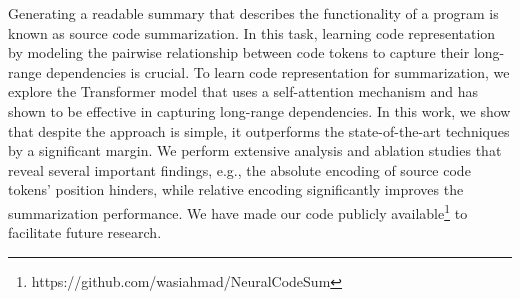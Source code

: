 Generating a readable summary that describes the functionality of a program is known as source code summarization. In this task, learning code representation by modeling the pairwise relationship between code tokens to capture their long-range dependencies is crucial. To learn code representation for summarization, we explore the Transformer model that uses a self-attention mechanism and has shown to be effective in capturing long-range dependencies. In this work, we show that despite the approach is simple, it outperforms the state-of-the-art techniques by a significant margin. We perform extensive analysis and ablation studies that reveal several important findings, e.g., the absolute encoding of source code tokens' position hinders, while relative encoding significantly improves the summarization performance. We have made our code publicly available\footnote{https://github.com/wasiahmad/NeuralCodeSum} to facilitate future research.
